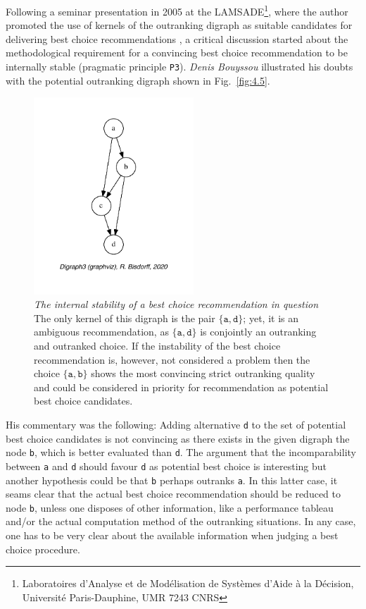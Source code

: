 Following a seminar presentation in 2005 at the LAMSADE\footnote{Laboratoires d'Analyse et de Modélisation de Systèmes d'Aide à la Décision, Université Paris-Dauphine, UMR 7243 CNRS}, where the author promoted the use of kernels of the outranking digraph as suitable candidates for delivering best choice recommendations \citep{BIS-2005}, a critical discussion started about the methodological requirement for a convincing best choice recommendation to be internally stable (pragmatic principle \texttt{P3}). \emph{Denis Bouyssou} illustrated his doubts with the potential outranking digraph shown in Fig.~\vref{fig:4.5}.
\begin{figure}[ht]
\sidecaption[t]
\includegraphics[width=6cm]{Figures/4-5-bouyssou11Oct05crisp.pdf}
\caption[The internal stability of a best choice recommendation in question]{\emph{The internal stability of a best choice recommendation in question}\\ The only kernel of this digraph is the pair $\{\mathtt{a},\mathtt{d}\}$; yet, it is an ambiguous recommendation, as $\{\mathtt{a},\mathtt{d}\}$ is conjointly an outranking and outranked choice. If the instability of the best choice recommendation is, however, not considered a problem then the choice $\{\mathtt{a},\mathtt{b}\}$ shows the most convincing strict outranking quality and could be considered in priority for recommendation as potential best choice candidates.}
\label{fig:4.5}       %
\end{figure}

His commentary was the following: Adding alternative \texttt{d} to the set of potential best choice candidates is not convincing as there exists in the given digraph the node \texttt{b}, which is better evaluated than \texttt{d}. The argument that the incomparability between \texttt{a} and \texttt{d} should favour \texttt{d} as potential best choice is interesting but another hypothesis could be that \texttt{b} perhaps outranks \texttt{a}. In this latter case, it seams clear that the actual best choice recommendation should be reduced to node \texttt{b}, unless one disposes of other information, like a performance tableau and/or the actual computation method of the outranking situations. In any case, one has to be very clear about the available information when judging a best choice procedure.

